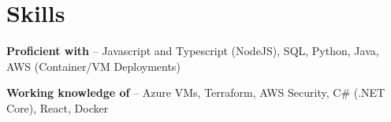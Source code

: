 \documentclass[letterpaper,10pt]{article}
\begin{document}
\section{Skills}
 \begin{itemize}[leftmargin=0.15in, label={}]
    \small{\item{
     \textbf{Proficient with} -- Javascript and Typescript (NodeJS), SQL, Python, Java, AWS (Container/VM Deployments)
    }}
    \small{\item{
     \textbf{Working knowledge of} -- Azure VMs, Terraform, AWS Security, C\# (.NET Core), React, Docker
    }}
 \end{itemize}
\end{document}
